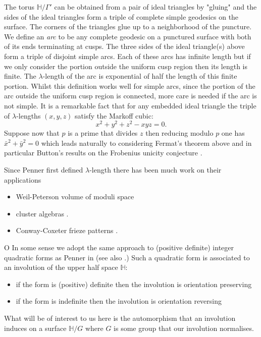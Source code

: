 \documentclass[12pt,a4paper]{amsart}
\begin{document}
The  torus $\mathbb{H}/\Gamma'$ can
be obtained from a pair of ideal triangles by "gluing" and the sides
of the ideal triangles form a triple of complete simple geodesics on
the surface. The corners of the triangles glue up to a neighborhood
of the puncture. We define an \textit{arc} to
be any complete geodesic on a punctured surface with both of its
ends terminating at cusps. The three sides of the ideal triangle(s)
above form a triple of disjoint simple arcs. Each of these arcs has
infinite length but if we only consider the portion outside the
uniform cusp region then its length is finite. The $\lambda$-length
of the arc is exponential of half the length of this finite portion.
Whilst this definition works well for simple arcs, since the portion of
the arc
outside the uniform cusp region is connected, more care is needed if
the arc is not simple.
It is a remarkable fact that for any embedded ideal triangle the
triple of $\lambda$-lengths $(x,y,z)$ satisfy the Markoff cubic:
\begin{equation}
	x^2 + y^2 + z^2 - xyz = 0.
\end{equation}
Suppose now that $p$ is a prime that divides $z$ 
then reducing modulo $p$ one has $\bar{x}^2 + \bar{y}^2 = 0$ which
leads naturally to considering Fermat's theorem above
and in particular Button's results on the Frobenius unicity
conjecture \cite{button}.

Since Penner \cite{bob} first defined $\lambda$-length 
there has been much work on their applications

\begin{itemize}
	\item Weil-Peterson volume of moduli space \cite{bob}
	\item cluster algebras \cite{fomin}.
	\item Conway-Coxeter frieze patterns \cite{frieze}.
\end{itemize}
O
In some sense we adopt the same approach to (positive definite) integer quadratic forms as
Penner in \cite{bob} (see also \cite{springborn1}.)
Such a
quadratic form is associated to an involution of the upper half
space $\mathbb{H}$: 
\begin{itemize}
	\item if the form is (positive) definite then the involution is orientation preserving 
	\item if the form is indefinite then the involution is
		orientation reversing 
\end{itemize}

What will be of interest to us here is the automorphism 
that an involution induces on a surface $\mathbb{H}/G$
where $G$ is some group that our involution normalises.
\end{document}
